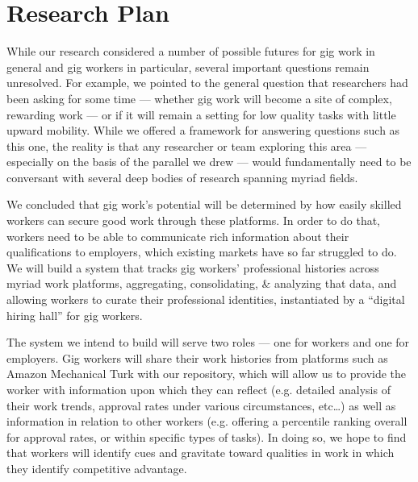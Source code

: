 \documentclass[10pt]{article}
\newcommand{\topic}[1]{{\color{Blue}#1}}
\renewcommand{\topic}[1]{{#1}}
\begin{document}
\section*{Research Plan}
\topic{While our research considered a number of possible futures for gig work in general and gig workers in particular,
several important questions remain unresolved.}
For example, we pointed to the general question that researchers had been asking for some time ---
whether gig work will become a site of complex, rewarding work
--- or if it will remain a setting for low quality tasks with little upward mobility.
While we offered a framework for answering questions such as this one, the reality is that
any researcher or team exploring this area
--- especially on the basis of the parallel we drew ---
would fundamentally need to be conversant with several deep bodies of research spanning myriad fields.

We concluded that gig work's potential will be determined by
how easily skilled workers can secure good work through these platforms.
In order to do that, workers need to be able to communicate rich information about their qualifications to employers,
which existing markets have so far struggled to do.
\topic{We will build a system that tracks gig workers' professional histories across myriad work platforms,
aggregating, consolidating, \& analyzing that data, and
allowing workers to curate their professional identities, instantiated by a ``digital hiring hall'' for gig workers.}


\topic{The system we intend to build will serve two roles --- one for workers and one for employers.}
Gig workers will share their work histories from platforms such as Amazon Mechanical Turk with our repository,
which will allow us to provide the worker with information upon which they can reflect
(e.g. detailed analysis of their work trends, approval rates under various circumstances, etc\dots)
as well as information in relation to other workers
(e.g. offering a percentile ranking overall for approval rates, or within specific types of tasks).
In doing so, we hope to find that workers will identify cues and gravitate toward qualities in work
in which they identify competitive advantage.
\end{document}
